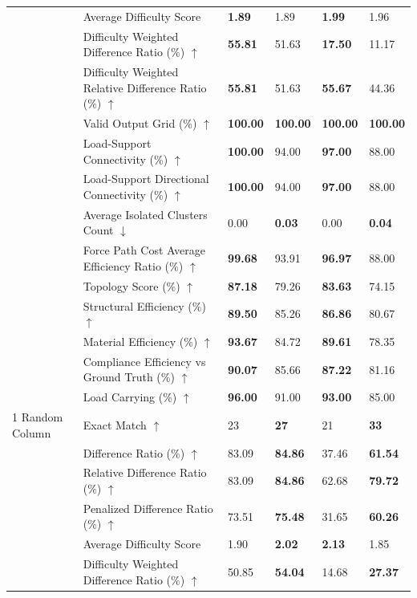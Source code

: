 \begin{table}[!h]
{\begin{tabular}{llll|ll}
 & Average Difficulty Score & \textbf{1.89} & 1.89 & \textbf{1.99} & 1.96 \\
 & Difficulty Weighted Difference Ratio (\%) $\uparrow$ & \textbf{55.81} & 51.63 & \textbf{17.50} & 11.17 \\
 & Difficulty Weighted Relative Difference Ratio (\%) $\uparrow$ & \textbf{55.81} & 51.63 & \textbf{55.67} & 44.36 \\
 & Valid Output Grid (\%) $\uparrow$ & \textbf{100.00} & \textbf{100.00} & \textbf{100.00} & \textbf{100.00} \\
 & Load-Support Connectivity (\%) $\uparrow$ & \textbf{100.00} & 94.00 & \textbf{97.00} & 88.00 \\
 & Load-Support Directional Connectivity (\%) $\uparrow$ & \textbf{100.00} & 94.00 & \textbf{97.00} & 88.00 \\
 & Average Isolated Clusters Count $\downarrow$ & 0.00 & \textbf{0.03} & 0.00 & \textbf{0.04} \\
 & Force Path Cost Average Efficiency Ratio (\%) $\uparrow$ & \textbf{99.68} & 93.91 & \textbf{96.97} & 88.00 \\
 & Topology Score (\%) $\uparrow$ & \textbf{87.18} & 79.26 & \textbf{83.63} & 74.15 \\
 & Structural Efficiency (\%) $\uparrow$ & \textbf{89.50} & 85.26 & \textbf{86.86} & 80.67 \\
 & Material Efficiency (\%) $\uparrow$ & \textbf{93.67} & 84.72 & \textbf{89.61} & 78.35 \\
 & Compliance Efficiency vs Ground Truth (\%) $\uparrow$ & \textbf{90.07} & 85.66 & \textbf{87.22} & 81.16 \\
 & Load Carrying (\%) $\uparrow$ & \textbf{96.00} & 91.00 & \textbf{93.00} & 85.00 \\
\midrule
1 Random Column & Exact Match $\uparrow$ & 23 & \textbf{27} & 21 & \textbf{33} \\
 & Difference Ratio (\%) $\uparrow$ & 83.09 & \textbf{84.86} & 37.46 & \textbf{61.54} \\
 & Relative Difference Ratio (\%) $\uparrow$ & 83.09 & \textbf{84.86} & 62.68 & \textbf{79.72} \\
 & Penalized Difference Ratio (\%) $\uparrow$ & 73.51 & \textbf{75.48} & 31.65 & \textbf{60.26} \\
 & Average Difficulty Score & 1.90 & \textbf{2.02} & \textbf{2.13} & 1.85 \\
 & Difficulty Weighted Difference Ratio (\%) $\uparrow$ & 50.85 & \textbf{54.04} & 14.68 & \textbf{27.37} \\

\end{tabular}}
\end{table}
